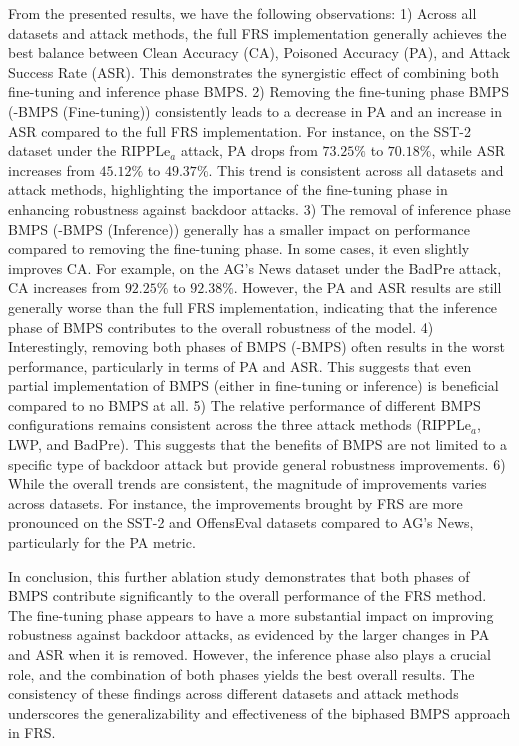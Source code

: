 From the presented results, we have the following observations: 1) Across all datasets and attack methods, the full FRS implementation generally achieves the best balance between Clean Accuracy (CA), Poisoned Accuracy (PA), and Attack Success Rate (ASR). This demonstrates the synergistic effect of combining both fine-tuning and inference phase BMPS. 2) 
Removing the fine-tuning phase BMPS (-BMPS (Fine-tuning)) consistently leads to a decrease in PA and an increase in ASR compared to the full FRS implementation. For instance, on the SST-2 dataset under the RIPPLe${_a}$ attack, PA drops from $73.25\%$ to $70.18\%$, while ASR increases from $45.12\%$ to $49.37\%$. This trend is consistent across all datasets and attack methods, highlighting the importance of the fine-tuning phase in enhancing robustness against backdoor attacks. 3) The removal of inference phase BMPS (-BMPS (Inference)) generally has a smaller impact on performance compared to removing the fine-tuning phase. In some cases, it even slightly improves CA. For example, on the AG's News dataset under the BadPre attack, CA increases from $92.25\%$ to $92.38\%$. However, the PA and ASR results are still generally worse than the full FRS implementation, indicating that the inference phase of BMPS contributes to the overall robustness of the model. 4) Interestingly, removing both phases of BMPS (-BMPS) often results in the worst performance, particularly in terms of PA and ASR. This suggests that even partial implementation of BMPS (either in fine-tuning or inference) is beneficial compared to no BMPS at all. 5) The relative performance of different BMPS configurations remains consistent across the three attack methods (RIPPLe${_a}$, LWP, and BadPre). This suggests that the benefits of BMPS are not limited to a specific type of backdoor attack but provide general robustness improvements. 6) While the overall trends are consistent, the magnitude of improvements varies across datasets. For instance, the improvements brought by FRS are more pronounced on the SST-2 and OffensEval datasets compared to AG's News, particularly for the PA metric.

In conclusion, this further ablation study demonstrates that both phases of BMPS contribute significantly to the overall performance of the FRS method. The fine-tuning phase appears to have a more substantial impact on improving robustness against backdoor attacks, as evidenced by the larger changes in PA and ASR when it is removed. However, the inference phase also plays a crucial role, and the combination of both phases yields the best overall results. The consistency of these findings across different datasets and attack methods underscores the generalizability and effectiveness of the biphased BMPS approach in FRS. 

